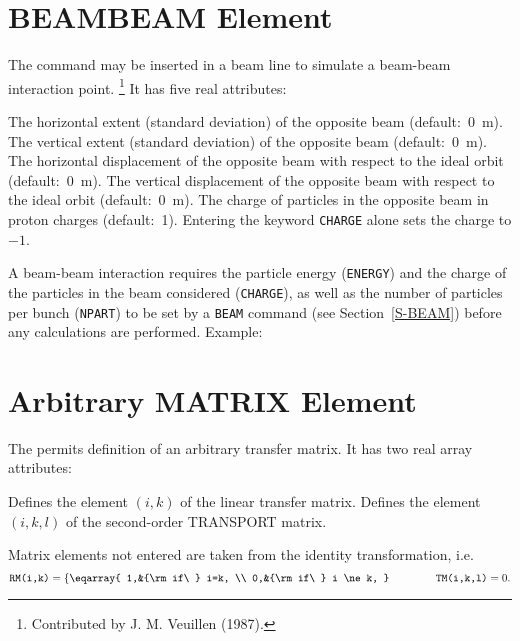 \section{BEAMBEAM Element}
\label{S-BB}
The command  may be inserted in a beam line
to simulate a beam-beam interaction point.%
\footnote{Contributed by J. M. Veuillen (1987).}
It has five real attributes:
\begin{mylist}
The horizontal extent (standard deviation) of the opposite beam
(default:~0~m).
The vertical extent (standard deviation) of the opposite beam
(default:~0~m).
The horizontal displacement of the opposite beam with respect to
the ideal orbit (default:~0~m).
The vertical displacement of the opposite beam with respect to
the ideal orbit (default:~0~m).
The charge of particles in the opposite beam in proton charges
(default:~1).
Entering the keyword {\tt CHARGE} alone sets the charge to \(-1\).
\end{mylist}
A beam-beam interaction requires the particle energy ({\tt ENERGY})
and the charge of the particles in the beam considered ({\tt CHARGE}),
as well as the number of particles per bunch ({\tt NPART})
to be set by a {\tt BEAM} command (see Section~\ref{S-BEAM})
before any calculations are performed.
Example:
 
\section{Arbitrary MATRIX Element}
\label{S-MATRIX}
The  permits definition of an arbitrary transfer matrix.
It has two real array attributes:
\begin{mylist}
Defines the element \((i,k)\) of the linear transfer matrix.
Defines the element \((i,k,l)\) of the second-order TRANSPORT matrix.
\end{mylist}
Matrix elements not entered are taken from the identity transformation,
i.e.
\[
\hbox{\tt RM(i,k)} = \left\{ \eqarray{
1,&{\rm if\ } i=k, \\ 0,&{\rm if\ } i \ne k,
} \right.
\qquad \qquad \hbox{\tt TM(i,k,l)} = 0.
\]
 
